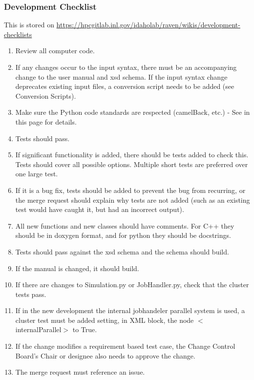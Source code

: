 \documentclass{article}
\begin{document}
\subsubsection{Development Checklist}

This is stored on \url{https://hpcgitlab.inl.gov/idaholab/raven/wikis/development-checklists}

\begin{enumerate}
\item    Review all computer code.
\item    If any changes occur to the input syntax, there must be an accompanying change to the user manual and xsd schema. If the input syntax change deprecates existing input files, a conversion script needs to be added (see Conversion Scripts).
\item    Make sure the Python code standards are respected (camelBack, etc.) - See in this page for details.
\item    Tests should pass.
\item    If significant functionality is added, there should be tests added to check this. Tests should cover all possible options. Multiple short tests are preferred over one large test.
\item    If it is a bug fix, tests should be added to prevent the bug from recurring, or the merge request should explain why tests are not added (such as an existing test would have caught it, but had an incorrect output).
\item    All new functions and new classes should have comments. For C++ they should be in doxygen format, and for python they should be docstrings.
\item    Tests should pass against the xsd schema and the schema should build.
\item    If the manual is changed, it should build.
\item    If there are changes to Simulation.py or JobHandler.py, check that the cluster tests pass.
\item    If in the new development the internal jobhandeler parallel system is used, a cluster test must be added setting, in XML block, the node $<$internalParallel$>$ to True.
\item    If the change modifies a requirement based test case, the Change Control Board's Chair or designee also needs to approve the change.
\item    The merge request must reference an issue.
\end{enumerate}
\end{document}
